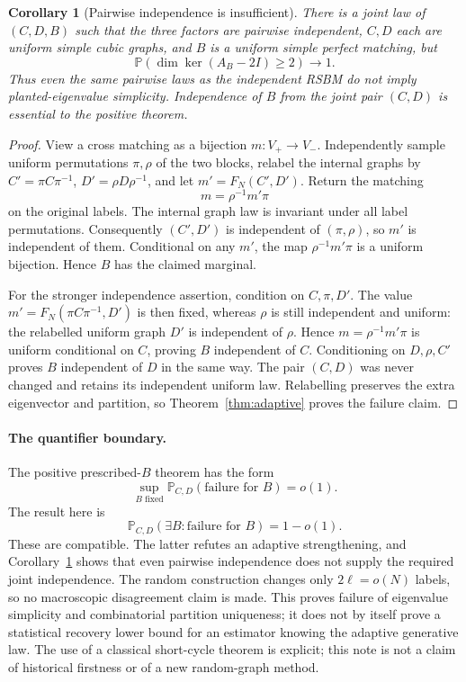 \documentclass[11pt]{article}
\newtheorem{corollary}{Corollary}
\newcommand{\Prob}{\mathbb P}
\begin{document}
\begin{corollary}[Pairwise independence is insufficient]
\label{cor:marginal}
There is a joint law of $(C,D,B)$ such that the three factors are
pairwise independent, $C,D$ each are uniform simple cubic graphs,
and $B$ is a uniform simple perfect matching, but
\[
             \Prob(\dim\ker(A_B-2I)\ge2)\longrightarrow1.
\]
Thus even the same pairwise laws as the independent RSBM do not
imply planted-eigenvalue simplicity. Independence of $B$ from the
joint pair $(C,D)$ is essential to the positive theorem.
\end{corollary}
\begin{proof}
View a cross matching as a bijection $m:V_+\to V_-$. Independently
sample uniform permutations $\pi,\rho$ of the two blocks, relabel the
internal graphs by $C'=\pi C\pi^{-1}$, $D'=\rho D\rho^{-1}$, and let
$m'=F_N(C',D')$. Return the matching
\[
                              m=\rho^{-1}m'\pi
\]
on the original labels. The internal graph law is invariant under
all label permutations. Consequently $(C',D')$ is independent of
$(\pi,\rho)$, so $m'$ is independent of them. Conditional on any
$m'$, the map $\rho^{-1}m'\pi$ is a uniform bijection. Hence $B$
has the claimed marginal.

For the stronger independence assertion, condition on $C,\pi,D'$.
The value $m'=F_N(\pi C\pi^{-1},D')$ is then fixed, whereas $\rho$
is still independent and uniform: the relabelled uniform graph $D'$
is independent of $\rho$. Hence $m=\rho^{-1}m'\pi$ is uniform
conditional on $C$, proving $B$ independent of $C$. Conditioning on
$D,\rho,C'$ proves $B$ independent of $D$ in the same way. The pair
$(C,D)$ was never changed and retains its independent uniform law.
Relabelling preserves the extra eigenvector and partition, so
Theorem~\ref{thm:adaptive} proves the failure claim.
\end{proof}

\paragraph{The quantifier boundary.}
The positive prescribed-$B$ theorem has the form
\[
       \sup_{B\text{ fixed}}\Prob_{C,D}(\text{failure for }B)=o(1).
\]
The result here is
\[
       \Prob_{C,D}(\exists B:\text{failure for }B)=1-o(1).
\]
These are compatible. The latter refutes an adaptive strengthening,
and Corollary~\ref{cor:marginal} shows that even pairwise independence
does not supply the required joint independence. The random construction changes only
$2\ell=o(N)$ labels, so no macroscopic disagreement claim is made.
This proves failure of eigenvalue simplicity and combinatorial partition
uniqueness; it does not by itself prove a statistical recovery lower
bound for an estimator knowing the adaptive generative law.
The use of a classical short-cycle theorem is explicit; this note is
not a claim of historical firstness or of a new random-graph method.
\end{document}
